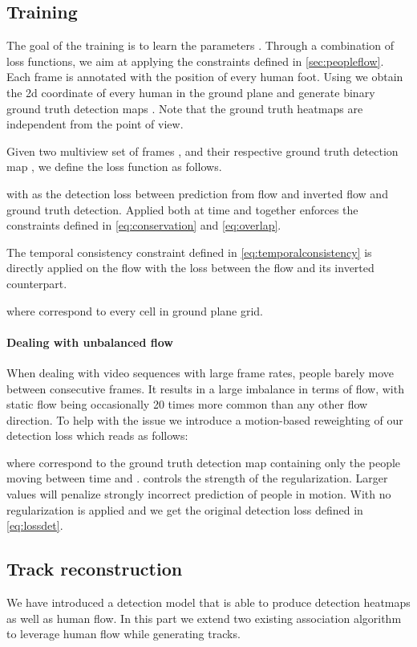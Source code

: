 \documentclass[10pt,twocolumn,letterpaper]{article}
\begin{document}
\subsection{Training}

The goal of the training is to learn the parameters . Through a combination of loss functions, we aim at applying the constraints defined in \cref{sec:peopleflow}.
Each frame  is annotated with the position of every human foot. Using  we obtain the 2d coordinate of every human in the ground plane
 and generate binary ground truth detection maps . Note that the ground truth heatmaps are independent from the point of view.

Given two multiview set of frames ,  and their respective ground truth detection map ,  we define the loss function as follows.

with  as the detection loss between prediction from flow and inverted flow and ground truth detection.
Applied both at time  and  together  enforces the constraints defined in \cref{eq:conservation} and \cref{eq:overlap}.

The temporal consistency constraint defined in \cref{eq:temporalconsistency} is directly applied on the flow with the loss  between the flow and its inverted counterpart.

where  correspond to every cell in ground plane grid.

\paragraph{Dealing with unbalanced flow} When dealing with video sequences with large frame rates, people barely move between consecutive frames.
It results in a large imbalance in terms of flow, with static flow being occasionally 20 times more common than any other flow direction.
To help with the issue we introduce a motion-based reweighting of our detection loss which reads as follows:

where  correspond to the ground truth detection map containing only the people moving between time  and . 
 controls the strength of the regularization. Larger values will penalize strongly incorrect prediction of people in motion.
With  no regularization is applied and we get the original detection loss defined in \cref{eq:lossdet}. 


\subsection{Track reconstruction}
\label{sec:kspflow}
We have introduced a detection model that is able to produce detection heatmaps as well as human flow.
In this part we extend two existing association algorithm to leverage human flow while generating tracks.
\end{document}
